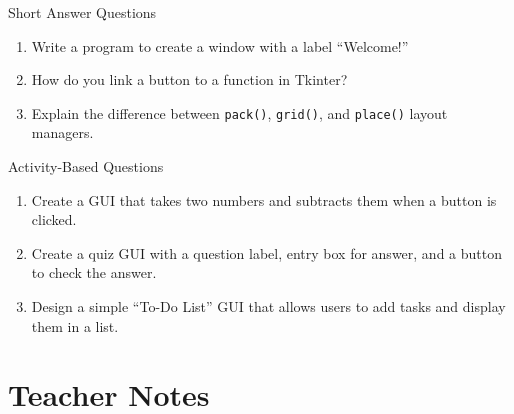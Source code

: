 \begin{exercise}{Short Answer Questions}
\begin{enumerate}
    \item Write a program to create a window with a label “Welcome!”  
    \item How do you link a button to a function in Tkinter?  
    \item Explain the difference between \texttt{pack()}, \texttt{grid()}, and \texttt{place()} layout managers.  
\end{enumerate}
\end{exercise}

\begin{exercise}{Activity-Based Questions}
\begin{enumerate}
    \item Create a GUI that takes two numbers and subtracts them when a button is clicked.  
    \item Create a quiz GUI with a question label, entry box for answer, and a button to check the answer.  
    \item Design a simple “To-Do List” GUI that allows users to add tasks and display them in a list.  
\end{enumerate}
\end{exercise}

\section{Teacher Notes}

